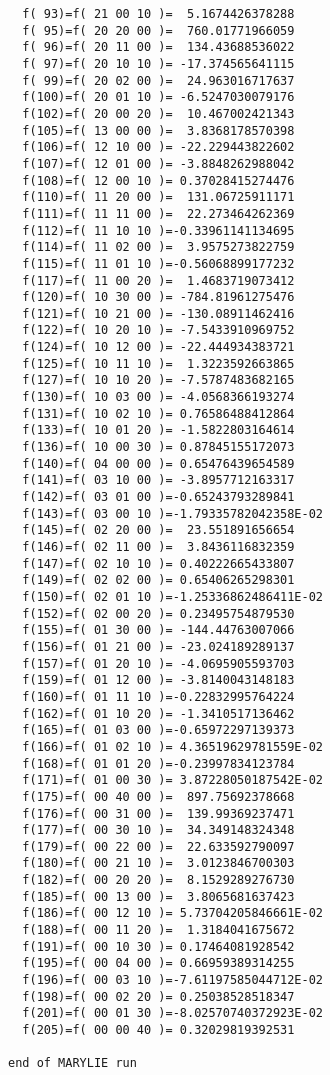 \begin{footnotesize}
\begin{verbatim}
  f( 93)=f( 21 00 10 )=  5.1674426378288
  f( 95)=f( 20 20 00 )=  760.01771966059
  f( 96)=f( 20 11 00 )=  134.43688536022
  f( 97)=f( 20 10 10 )= -17.374565641115
  f( 99)=f( 20 02 00 )=  24.963016717637
  f(100)=f( 20 01 10 )= -6.5247030079176
  f(102)=f( 20 00 20 )=  10.467002421343
  f(105)=f( 13 00 00 )=  3.8368178570398
  f(106)=f( 12 10 00 )= -22.229443822602
  f(107)=f( 12 01 00 )= -3.8848262988042
  f(108)=f( 12 00 10 )= 0.37028415274476
  f(110)=f( 11 20 00 )=  131.06725911171
  f(111)=f( 11 11 00 )=  22.273464262369
  f(112)=f( 11 10 10 )=-0.33961141134695
  f(114)=f( 11 02 00 )=  3.9575273822759
  f(115)=f( 11 01 10 )=-0.56068899177232
  f(117)=f( 11 00 20 )=  1.4683719073412
  f(120)=f( 10 30 00 )= -784.81961275476
  f(121)=f( 10 21 00 )= -130.08911462416
  f(122)=f( 10 20 10 )= -7.5433910969752
  f(124)=f( 10 12 00 )= -22.444934383721
  f(125)=f( 10 11 10 )=  1.3223592663865
  f(127)=f( 10 10 20 )= -7.5787483682165
  f(130)=f( 10 03 00 )= -4.0568366193274
  f(131)=f( 10 02 10 )= 0.76586488412864
  f(133)=f( 10 01 20 )= -1.5822803164614
  f(136)=f( 10 00 30 )= 0.87845155172073
  f(140)=f( 04 00 00 )= 0.65476439654589
  f(141)=f( 03 10 00 )= -3.8957712163317
  f(142)=f( 03 01 00 )=-0.65243793289841
  f(143)=f( 03 00 10 )=-1.79335782042358E-02
  f(145)=f( 02 20 00 )=  23.551891656654
  f(146)=f( 02 11 00 )=  3.8436116832359
  f(147)=f( 02 10 10 )= 0.40222665433807
  f(149)=f( 02 02 00 )= 0.65406265298301
  f(150)=f( 02 01 10 )=-1.25336862486411E-02
  f(152)=f( 02 00 20 )= 0.23495754879530
  f(155)=f( 01 30 00 )= -144.44763007066
  f(156)=f( 01 21 00 )= -23.024189289137
  f(157)=f( 01 20 10 )= -4.0695905593703
  f(159)=f( 01 12 00 )= -3.8140043148183
  f(160)=f( 01 11 10 )=-0.22832995764224
  f(162)=f( 01 10 20 )= -1.3410517136462
  f(165)=f( 01 03 00 )=-0.65972297139373
  f(166)=f( 01 02 10 )= 4.36519629781559E-02
  f(168)=f( 01 01 20 )=-0.23997834123784
  f(171)=f( 01 00 30 )= 3.87228050187542E-02
  f(175)=f( 00 40 00 )=  897.75692378668
  f(176)=f( 00 31 00 )=  139.99369237471
  f(177)=f( 00 30 10 )=  34.349148324348
  f(179)=f( 00 22 00 )=  22.633592790097
  f(180)=f( 00 21 10 )=  3.0123846700303
  f(182)=f( 00 20 20 )=  8.1529289276730
  f(185)=f( 00 13 00 )=  3.8065681637423
  f(186)=f( 00 12 10 )= 5.73704205846661E-02
  f(188)=f( 00 11 20 )=  1.3184041675672
  f(191)=f( 00 10 30 )= 0.17464081928542
  f(195)=f( 00 04 00 )= 0.66959389314255
  f(196)=f( 00 03 10 )=-7.61197585044712E-02
  f(198)=f( 00 02 20 )= 0.25038528518347
  f(201)=f( 00 01 30 )=-8.02570740372923E-02
  f(205)=f( 00 00 40 )= 0.32029819392531

end of MARYLIE run
\end{verbatim}
\end{footnotesize}

